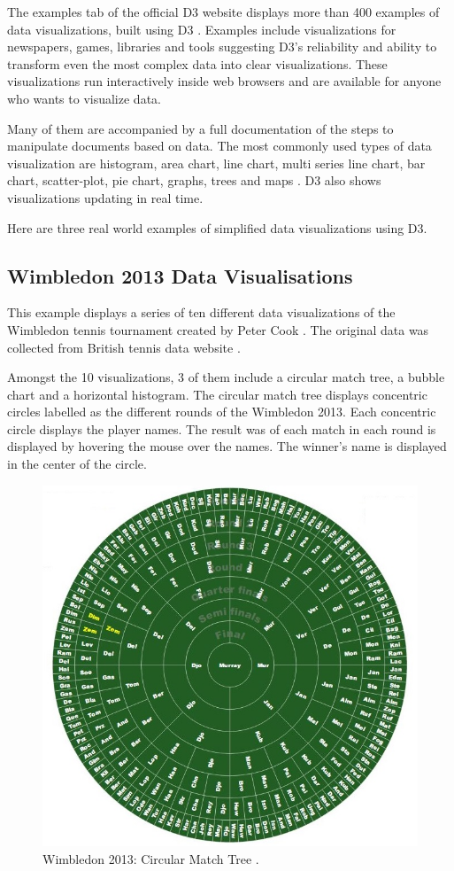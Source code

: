 \documentclass[9pt,twocolumn,twoside]{../../styles/osajnl}
\begin{document}
The examples tab of the official D3 website displays more than 400 examples of data visualizations, built using D3 \cite{www-gallery}. Examples include visualizations for newspapers, games, libraries and tools suggesting D3's reliability and ability to transform even the most complex data into clear visualizations. These visualizations run interactively inside web browsers and are available for anyone who wants to visualize data. 

Many of them are accompanied by a full documentation of the steps to manipulate documents based on data. The most commonly used types of data visualization are histogram, area chart, line chart, multi series line chart, bar chart, scatter-plot, pie chart, graphs, trees and maps \cite{www-gallery}. D3 also shows visualizations updating in real time.

Here are three real world examples of simplified data visualizations using D3.

\subsection{Wimbledon 2013 Data Visualisations}
This example displays a series of ten different
data visualizations of the Wimbledon tennis tournament created by Peter Cook \cite{www-cook}. The original data was collected from British tennis data
website \cite{www-tennis}.

Amongst the 10 visualizations, 3 of them include a circular match tree, a bubble chart and a horizontal histogram. The circular match tree displays concentric circles labelled as the different rounds of the Wimbledon 2013. Each concentric circle displays the player names. The result was of each match in each round is displayed by hovering the mouse over the names. The winner's name is displayed in the center of the circle.

\begin{figure}[h]
\centering
\includegraphics[scale=0.3]{images/1}
\centering
\caption{Wimbledon 2013: Circular Match Tree \cite{www-cmt}.}
\end{figure}
\end{document}
